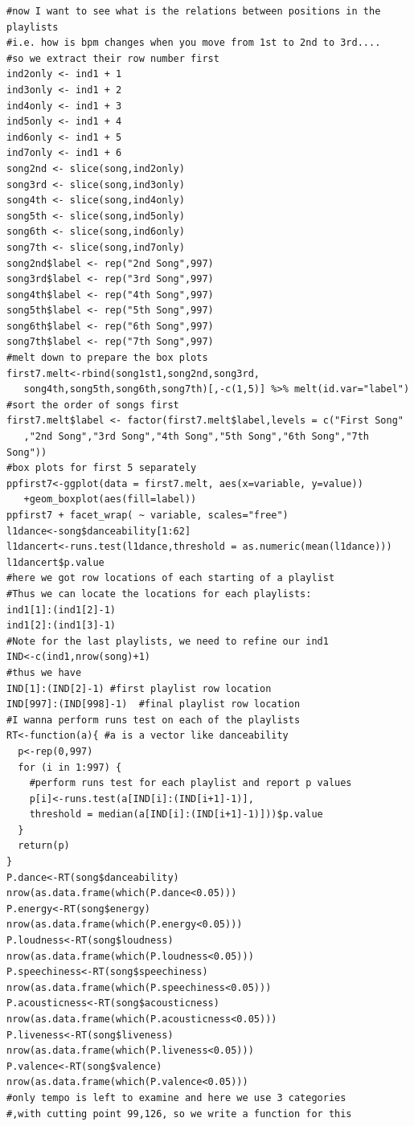 \documentclass[12pt]{article}
\theoremstyle{plain}
\theoremstyle{definition}
\theoremstyle{remark}
\begin{document}
\begin{appendices}
\begin{verbatim}
#now I want to see what is the relations between positions in the playlists
#i.e. how is bpm changes when you move from 1st to 2nd to 3rd....
#so we extract their row number first
ind2only <- ind1 + 1
ind3only <- ind1 + 2
ind4only <- ind1 + 3
ind5only <- ind1 + 4
ind6only <- ind1 + 5
ind7only <- ind1 + 6
song2nd <- slice(song,ind2only)
song3rd <- slice(song,ind3only)
song4th <- slice(song,ind4only)
song5th <- slice(song,ind5only)
song6th <- slice(song,ind6only)
song7th <- slice(song,ind7only)
song2nd$label <- rep("2nd Song",997)
song3rd$label <- rep("3rd Song",997)
song4th$label <- rep("4th Song",997)
song5th$label <- rep("5th Song",997)
song6th$label <- rep("6th Song",997)
song7th$label <- rep("7th Song",997)
#melt down to prepare the box plots
first7.melt<-rbind(song1st1,song2nd,song3rd,
   song4th,song5th,song6th,song7th)[,-c(1,5)] %>% melt(id.var="label")
#sort the order of songs first
first7.melt$label <- factor(first7.melt$label,levels = c("First Song"
   ,"2nd Song","3rd Song","4th Song","5th Song","6th Song","7th Song"))
#box plots for first 5 separately
ppfirst7<-ggplot(data = first7.melt, aes(x=variable, y=value))
   +geom_boxplot(aes(fill=label))
ppfirst7 + facet_wrap( ~ variable, scales="free")
l1dance<-song$danceability[1:62]
l1dancert<-runs.test(l1dance,threshold = as.numeric(mean(l1dance)))
l1dancert$p.value
#here we got row locations of each starting of a playlist
#Thus we can locate the locations for each playlists:
ind1[1]:(ind1[2]-1)
ind1[2]:(ind1[3]-1)
#Note for the last playlists, we need to refine our ind1
IND<-c(ind1,nrow(song)+1)
#thus we have
IND[1]:(IND[2]-1) #first playlist row location
IND[997]:(IND[998]-1)  #final playlist row location
#I wanna perform runs test on each of the playlists
RT<-function(a){ #a is a vector like danceability
  p<-rep(0,997)
  for (i in 1:997) {
    #perform runs test for each playlist and report p values
    p[i]<-runs.test(a[IND[i]:(IND[i+1]-1)],
    threshold = median(a[IND[i]:(IND[i+1]-1)]))$p.value
  }
  return(p)
}
P.dance<-RT(song$danceability)
nrow(as.data.frame(which(P.dance<0.05)))
P.energy<-RT(song$energy)
nrow(as.data.frame(which(P.energy<0.05)))
P.loudness<-RT(song$loudness)
nrow(as.data.frame(which(P.loudness<0.05)))
P.speechiness<-RT(song$speechiness)
nrow(as.data.frame(which(P.speechiness<0.05)))
P.acousticness<-RT(song$acousticness)
nrow(as.data.frame(which(P.acousticness<0.05)))
P.liveness<-RT(song$liveness)
nrow(as.data.frame(which(P.liveness<0.05)))
P.valence<-RT(song$valence)
nrow(as.data.frame(which(P.valence<0.05)))
#only tempo is left to examine and here we use 3 categories
#,with cutting point 99,126, so we write a function for this

\end{verbatim}
\end{appendices}
\end{document}
